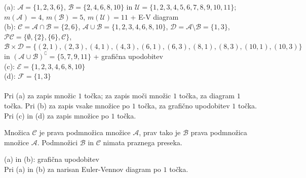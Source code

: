 \documentclass[addpoints]{exam}
\begin{document}
\begin{questions}
    \begin{solution}[12cm]
        (a): $\mathcal{A}=\{1,2,3,6\}$, $\mathcal{B}=\{2,4,6,8,10\}$ in $\mathcal{U}=\{1,2,3,4,5,6,7,8,9,10,11\}$; $m(\mathcal{A})=4$, $m(\mathcal{B})=5$, $m(\mathcal{U})=11$ + E-V diagram \\
        (b): $\mathcal{C}=\mathcal{A}\cap\mathcal{B}=\{2,6\}$, $\mathcal{A}\cup\mathcal{B}=\{1,2,3,4,6,8,10\}$, $\mathcal{D}=\mathcal{A}\setminus\mathcal{B}=\{1,3\}$, $\mathcal{PC}=\{\emptyset,\{2\},\{6\},\mathcal{C}\}$, $\mathcal{B}\times\mathcal{D}=\{(2,1),(2,3),(4,1),(4,3),(6,1),(6,3),(8,1),(8,3),(10,1),(10,3)\}$ in $(\mathcal{A}\cup\mathcal{B})^\complement=\{5,7,9,11\}$ + grafična upodobitev\\
        (c): $\mathcal{E}=\{1,2,3,4,6,8,10\}$ \\
        (d): $\mathcal{F}=\{1,3\}$ \\ \\
        Pri (a) za zapis množic $1$ točka; za zapis moči množic $1$ točka, za diagram $1$ točka. Pri (b) za zapis vsake množice po $1$ točka, za grafično upodobitev $1$ točka. Pri (c) in (d) za zapis množice po $1$ točka.
    \end{solution}


    \newpage

    \question
    Množica $\mathcal{C}$ je prava podmnožica množice $\mathcal{A}$, prav tako je $\mathcal{B}$ prava podmnožica množice $\mathcal{A}$. Podmnožici $\mathcal{B}$ in $\mathcal{C}$ nimata praznega preseka.

    \begin{solution}[7cm]
        (a) in (b): grafična upodobitev \\
        Pri (a) in (b) za narisan Euler-Vennov diagram po $1$ točka.
    \end{solution}





\end{questions}
\end{document}
